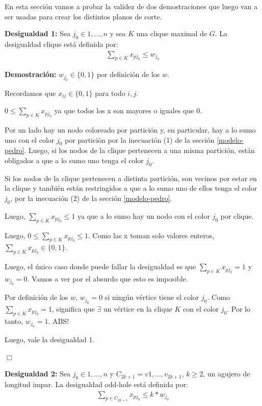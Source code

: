 \documentclass[a4paper, 10pt, twoside]{article}
\begin{document}
En esta sección vamos a probar la validez de dos demostraciones que luego van a ser usadas para crear los distintos planos de corte.

\textbf{Desigualdad 1:} Sea $j_0 \in {1, \ldots, n}$ y sea $K$ una clique maximal de $G$. La desigualdad clique está definida por:
\begin{align*}
\sum_{p \in K} x_{pj_0} \leq w_{j_0}
\end{align*}

\textbf{Demostración:}
$w_{j_0} \in \{0,1\}$ por definición de los $w$.

Recordamos que $x_{ij} \in \{0,1\}$ para todo $i, j$.

$0 \leq \sum_{p \in K} x_{pj_0}$ ya que todos los x son mayores o iguales que $0$.

Por un lado hay un nodo coloreado por partición y, en particular, hay a lo sumo uno con el color $j_0$ por partición por la inecuación (1) de la sección \ref{modelo-pedro}. Luego, si los nodos de la clique pertenecen a una misma partición, están obligados a que a lo sumo uno tenga el color $j_0$.

Si los nodos de la clique pertenecen a distinta partición, son vecinos por estar en la clique y también están restringidos a que a lo sumo uno de ellos tenga el color $j_0$, por la inecuación (2) de la sección \ref{modelo-pedro}.

Luego, $\sum_{p \in K} x_{pj_0} \leq 1$ ya que a lo sumo hay un nodo con el color $j_0$ por clique.

Luego, $0 \leq \sum_{p \in K} x_{pj_0} \leq 1$. Como las x toman solo valores enteros, $\sum_{p \in K} x_{pj_0} \in \{0,1\}$.

Luego, el único caso donde puede fallar la desigualdad es que $\sum_{p \in K} x_{pj_0} = 1$ y $w_{j_0} = 0$. Vamos a ver por el absurdo que esto es imposible.

Por definición de los $w$, $w_{j_0} = 0$ si ningún vértice tiene el color $j_0$. Como $\sum_{p \in K} x_{pj_0} = 1$, significa que $\exists$ un vértice en la clique $K$ con el color $j_0$. Por lo tanto, $w_{j_0} = 1$. ABS!

Luego, vale la desigualdad 1.

\hfill \ensuremath{\Box}

\textbf{Desigualdad 2:} Sea $j_0 \in {1, \ldots, n}$ y $C_{2k+1} = v1, \ldots, v_{2k+1}$, $k \geq 2$, un agujero de longitud impar. La desigualdad odd-hole está definida por:
\begin{align*}
\sum_{p \in C_{2k+1}} x_{pj_0} \leq  k * w_{j_0}
\end{align*}
\end{document}
